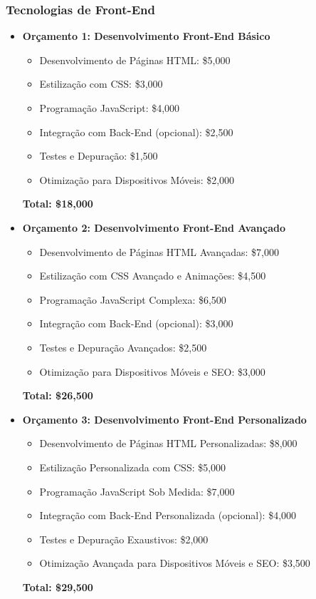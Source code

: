 	
	\subsubsection{Tecnologias de Front-End}
	\begin{itemize}
		\item \textbf{Orçamento 1: Desenvolvimento Front-End Básico}
		\begin{itemize}
			\item Desenvolvimento de Páginas HTML: \$5,000
			\item Estilização com CSS: \$3,000
			\item Programação JavaScript: \$4,000
			\item Integração com Back-End (opcional): \$2,500
			\item Testes e Depuração: \$1,500
			\item Otimização para Dispositivos Móveis: \$2,000
		\end{itemize}
		
		\textbf{Total: \$18,000}
		
		\item \textbf{Orçamento 2: Desenvolvimento Front-End Avançado}
		\begin{itemize}
			\item Desenvolvimento de Páginas HTML Avançadas: \$7,000
			\item Estilização com CSS Avançado e Animações: \$4,500
			\item Programação JavaScript Complexa: \$6,500
			\item Integração com Back-End (opcional): \$3,000
			\item Testes e Depuração Avançados: \$2,500
			\item Otimização para Dispositivos Móveis e SEO: \$3,000
		\end{itemize}
		
		\textbf{Total: \$26,500}
		
		\item \textbf{Orçamento 3: Desenvolvimento Front-End Personalizado}
		\begin{itemize}
			\item Desenvolvimento de Páginas HTML Personalizadas: \$8,000
			\item Estilização Personalizada com CSS: \$5,000
			\item Programação JavaScript Sob Medida: \$7,000
			\item Integração com Back-End Personalizada (opcional): \$4,000
			\item Testes e Depuração Exaustivos: \$2,000
			\item Otimização Avançada para Dispositivos Móveis e SEO: \$3,500
		\end{itemize}
		
		\textbf{Total: \$29,500}
	\end{itemize}
	
